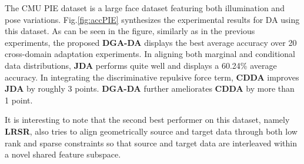 \documentclass[journal,twocolumn]{IEEEtran}
\begin{document}
\begin{CJK*}{UTF8}{gkai}
The CMU PIE dataset is a large face dataset featuring both illumination and pose variations. Fig.\ref{fig:accPIE} synthesizes the experimental results for DA using this dataset. As can be seen in the figure, similarly as in the previous experiments, the proposed \textbf{DGA-DA} displays the best average accuracy over 20 cross-domain adaptation experiments. In aligning both marginal and conditional data distributions, \textbf{JDA} performs quite well and displays a 60.24\% average accuracy. In integrating the discriminative repulsive force term, \textbf{CDDA} improves \textbf{JDA} by roughly 3 points. \textbf{DGA-DA} further ameliorates \textbf{CDDA} by more than 1 point.   


It is interesting to note that the second best performer on this dataset, namely \textbf{LRSR}, also tries to align geometrically source and target data through both low rank and sparse constraints so that source and target data are interleaved within a novel shared feature subspace. 



\end{CJK*}
\end{document}
